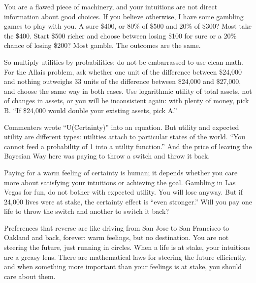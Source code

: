You are a flawed piece of machinery, and your intuitions are not direct information about good choices. If you believe otherwise, I have some gambling games to play with you. A sure \$400, or 80\% of \$500 and 20\% of \$300? Most take the \$400. Start \$500 richer and choose between losing \$100 for sure or a 20\% chance of losing \$200? Most gamble. The outcomes are the same. 

So multiply utilities by probabilities; do not be embarrassed to use clean math. For the Allais problem, ask whether one unit of the difference between \$24,000 and nothing outweighs 33 units of the difference between \$24,000 and \$27,000, and choose the same way in both cases. Use logarithmic utility of total assets, not of changes in assets, or you will be inconsistent again: with plenty of money, pick B. ``If \$24,000 would double your existing assets, pick A.'' 

Commenters wrote ``U(Certainty)'' into an equation. But utility and expected utility are different types: utilities attach to particular states of the world. ``You cannot feed a probability of 1 into a utility function.'' And the price of leaving the Bayesian Way here was paying to throw a switch and throw it back. 

Paying for a warm feeling of certainty is human; it depends whether you care more about satisfying your intuitions or achieving the goal. Gambling in Las Vegas for fun, do not bother with expected utility. You will lose anyway. But if 24,000 lives were at stake, the certainty effect is ``even stronger.'' Will you pay one life to throw the switch and another to switch it back? 

Preferences that reverse are like driving from San Jose to San Francisco to Oakland and back, forever: warm feelings, but no destination. You are not steering the future, just running in circles. When a life is at stake, your intuitions are a greasy lens. There are mathematical laws for steering the future efficiently, and when something more important than your feelings is at stake, you should care about them.
